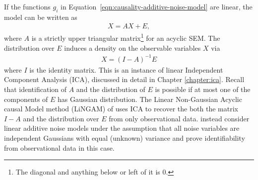 If the functions $g_i$ in Equation~\ref{eqn:causality-additive-noise-model} are linear, the model can be written as
%
\begin{align}\label{eqn:causality-linear-additive-noise-model}
X = AX + E,
\end{align}
%
where $A$ is a strictly upper triangular matrix\footnote{The diagonal and anything below or left of it is 0.} for an acyclic SEM. 
The distribution over $E$ induces a density on the observable variables $X$ via
%
\begin{align*}
X = (I-A)^{-1} E
\end{align*}
%
where $I$ is the identity matrix. 
This is an instance of linear Independent Component Analysis (ICA), discussed in detail in Chapter \ref{chapter:ica}. %
Recall that identification of $A$ and the distribution of $E$ is possible if at most one of the components of $E$ has Gaussian distribution.
The Linear Non-Gaussian Acyclic causal Model method (LiNGAM) of \cite{shimizu2006linear} uses ICA to recover the both the matrix $I-A$ and the distribution over $E$ from only observational data.
\cite{peters2013identifiability} instead consider linear additive noise models under the assumption that all noise variables are independent Gaussians with equal (unknown) variance and prove identifiability from observational data in this case. 

